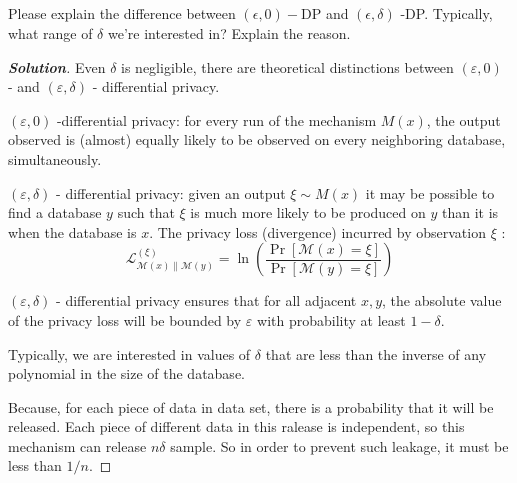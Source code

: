 \documentclass{ctexart}
\newenvironment{solution}{\begin{proof}[\indent\bf Solution]}{\end{proof}}
\begin{document}
\subsection{}
Please explain the difference between $(\epsilon, 0)-\mathrm{DP}$ and $(\epsilon, \delta)$ -DP. Typically, what range of $\delta$ we're interested in? Explain the reason.
\par
\begin{solution}
    Even $\delta$ is negligible, there are theoretical distinctions between $(\varepsilon, 0)$ - and $(\varepsilon, \delta)$ - differential privacy.
    \par $(\varepsilon, 0)$ -differential privacy: for every run of the mechanism $M(x)$, the output observed is (almost) equally likely to be observed on every neighboring database, simultaneously.
    \par $(\varepsilon, \delta)$ - differential privacy: given an output $\xi \sim M(x)$ it may be possible to find a database $y$ such that $\xi$ is much more likely to be produced on $y$ than it is when the database is $x$.
    The privacy loss (divergence) incurred by observation $\xi$ :
    $$
        \mathcal{L}_{\mathcal{M}(x) \| \mathcal{M}(y)}^{(\xi)}=\ln \left(\frac{\operatorname{Pr}[\mathcal{M}(x)=\xi]}{\operatorname{Pr}[\mathcal{M}(y)=\xi]}\right)
    $$
    \par $(\varepsilon, \delta)$ - differential privacy ensures that for all adjacent $x, y$, the absolute value of the privacy loss will be bounded by $\varepsilon$ with probability at least $1-\delta$.
    \par
    Typically, we are interested in values of $\delta$ that are less than the inverse
    of any polynomial in the size of the database.
    \par
    Because, for each piece of data in data set, there is a probability that it will be released. Each piece of different data in this ralease is independent,
    so this mechanism can release $n\delta$ sample. So in order to prevent such leakage, it must be less than $1/n$.

\end{solution}
\end{document}
